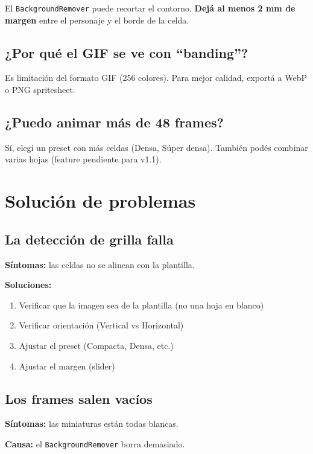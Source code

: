 \documentclass[12pt,a4paper]{article}
\begin{document}
El \texttt{BackgroundRemover} puede recortar el contorno. \textbf{Dejá al menos 2 mm de margen}
entre el personaje y el borde de la celda.

\subsection{¿Por qué el GIF se ve con ``banding''?}

Es limitación del formato GIF (256 colores). Para mejor calidad, exportá a WebP
o PNG spritesheet.

\subsection{¿Puedo animar más de 48 frames?}

Sí, elegí un preset con más celdas (Densa, Súper densa). También podés combinar
varias hojas (feature pendiente para v1.1).

\section{Solución de problemas}

\subsection{La detección de grilla falla}

\textbf{Síntomas:} las celdas no se alinean con la plantilla.

\textbf{Soluciones:}
\begin{enumerate}[leftmargin=*]
    \item Verificar que la imagen sea de la plantilla (no una hoja en blanco)
    \item Verificar orientación (Vertical vs Horizontal)
    \item Ajustar el preset (Compacta, Densa, etc.)
    \item Ajustar el margen (slider)
\end{enumerate}

\subsection{Los frames salen vacíos}

\textbf{Síntomas:} las miniaturas están todas blancas.

\textbf{Causa:} el \texttt{BackgroundRemover} borra demasiado.
\end{document}
